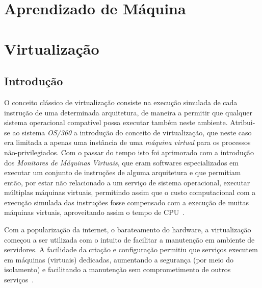 %
%

\chapter{Aprendizado de Máquina}\label{sec:aprendizado}



\chapter{Virtualização}

\section{Introdução}\label{sec:virt}

O conceito clássico de virtualização consiste na execução simulada de cada
instrução de uma determinada arquitetura, de maneira a permitir que
qualquer sistema operacional compatível possa executar também neste
ambiente.  Atribui-se ao sistema \emph{OS/360} a introdução do conceito de
virtualização, que neste caso era limitada a apenas uma instância de uma
\emph{máquina virtual} para os processos não-privilegiados. Com o passar do
tempo isto foi aprimorado com a introdução dos \emph{Monitores de Máquinas
Virtuais}, que eram softwares especializados em executar um conjunto de
instruções de alguma arquitetura e que permitiam então, por estar não
relacionado a um serviço de sistema operacional, executar múltiplas
máquinas virtuais, permitindo assim que o custo computacional com a
execução simulada das instruções fosse compensado com a execução de muitas
máquinas virtuais, aproveitando assim o tempo de
CPU~\cite{goldberg1974survey}.

Com a popularização da internet, o barateamento do hardware, a
virtualização começou a ser utilizada com o intuito de facilitar a
manutenção em ambiente de servidores. A facilidade da criação e
configuração permitiu que serviços executem em máquinas (virtuais)
dedicadas, aumentando a segurança (por meio do isolamento) e facilitando a
manutenção sem comprometimento de outros serviços~\cite{peter2005resource}.



\section{\libvirt}\label{sec:libvirt}

